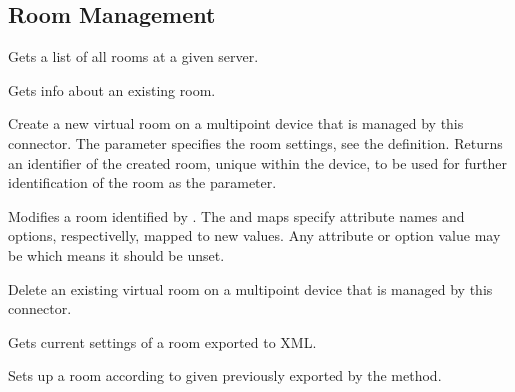 \subsection{Room Management}
\begin{Api}

Gets a list of all rooms at a given server.

Gets info about an existing room.

Create a new virtual room on a multipoint device that is managed by this connector. The  parameter specifies the room settings, see the  definition. Returns an identifier of the created room, unique within the device, to be used for further identification of the room as the  parameter.

Modifies a room identified by . The  and  maps specify  attribute names and options, respectivelly, mapped to new values. Any attribute or option value may be  which means it should be unset.

Delete an existing virtual room on a multipoint device that is managed by this connector.

Gets current settings of a room exported to XML.
\\

Sets up a room according to given  previously exported by the  method.

\end{Api}


